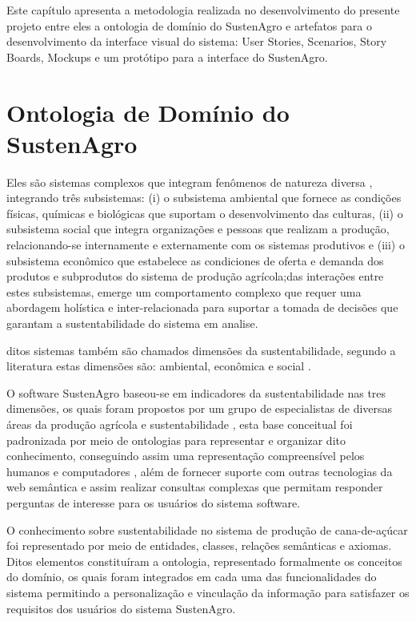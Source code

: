 Este capítulo apresenta a metodologia realizada no desenvolvimento
do presente projeto entre eles a ontologia de domínio do SustenAgro
e artefatos para o desenvolvimento da interface visual do sistema:
User Stories, Scenarios, Story Boards, Mockups e um protótipo para
a interface do SustenAgro.

\section{Ontologia de Domínio do SustenAgro}

Eles são sistemas complexos que integram fenômenos de natureza diversa
\citep{simon1991architecture}, integrando três subsistemas: (i) o
subsistema ambiental que fornece as condições físicas, químicas e
biológicas que suportam o desenvolvimento das culturas, (ii) o subsistema
social que integra organizações e pessoas que realizam a produção,
relacionando-se internamente e externamente com os sistemas produtivos
e (iii) o subsistema econômico que estabelece as condiciones de oferta
e demanda dos produtos e subprodutos do sistema de produção agrícola;das
interações entre estes subsistemas, emerge um comportamento complexo
que requer uma abordagem holística e inter-relacionada para suportar
a tomada de decisões que garantam a sustentabilidade do sistema em
analise.

ditos sistemas também são chamados dimensões da sustentabilidade,
segundo a literatura estas dimensões são: ambiental, econômica e social
\citep{AlkanOlsson:2009}.

O software SustenAgro baseou-se em indicadores da sustentabilidade
nas tres dimensões, os quais foram propostos por um grupo de especialistas
de diversas áreas da produção agrícola e sustentabilidade \citep{oliveira:2013},
esta base conceitual foi padronizada por meio de ontologias para representar
e organizar dito conhecimento, conseguindo assim uma representação
compreensível pelos humanos e computadores \citep{allemang2011semantic},
além de fornecer suporte com outras tecnologias da web semântica e
assim realizar consultas complexas que permitam responder perguntas
de interesse para os usuários do sistema software.

O conhecimento sobre sustentabilidade no sistema de produção de cana-de-açúcar
foi representado por meio de entidades, classes, relações semânticas
e axiomas. Ditos elementos constituíram a ontologia, representado
formalmente os conceitos do domínio, os quais foram integrados em
cada uma das funcionalidades do sistema permitindo a personalização
e vinculação da informação para satisfazer os requisitos dos usuários
do sistema SustenAgro.

